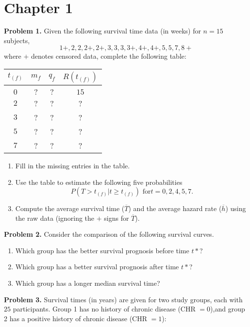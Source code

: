 \documentclass[12pt]{article}
\begin{document}
\section{Chapter 1}



\textbf{Problem 1.}
Given the following survival time data (in weeks) for $n = 15$ subjects,
$$
1+, 2, 2, 2+, 2+, 3, 3, 3, 3+, 4+, 4+, 5, 5, 7, 8+
$$ where $+$ denotes censored data, complete the following table:

\begin{center}
\begin{tabular}{ c c c c }
 $t_{(f)}$ & $m_{f}$ & $q_{f}$ & $R(t_{(f)})$ \\
 \hline \\
 $0$ & $?$ & $?$ & $15$ \\
 $2$ &?  &?  &? \\
 $3$ &?  &?  &? \\
 $5$ &?  &?  &? \\
 $7$ &?  &?  &?
\end{tabular}
\end{center}

\begin{enumerate}
\item Fill in the missing entries in the table. 
\item Use the table to estimate the following five probabilities
\[
P(T>t_{(f)}|t \ge t_{(f)}) \text{ for} t=0,2,4,5,7. 
\]
\item Compute the average survival time ($\overline{T}$) and the average hazard rate ($\overline{h}$) using the raw data (ignoring the $+$ signs for $\overline{T}$). 
\end{enumerate} 



\textbf{Problem 2.}
Consider the comparison of the following survival curves.
\vspace{30pt}
\begin{enumerate}
\item Which group has the better survival prognosis before time $t*$? 
\item Which group has a better survival prognosis after time $t*$? 
\item Which group has a longer median survival time? 
\end{enumerate}





\textbf{Problem 3.}
Survival times (in years) are given for two study groups, each with $25$ participants. Group 1 has no history of chronic disease (CHR $= 0$),and group 2 has a positive history of chronic disease (CHR $= 1$): \\
\end{document}
